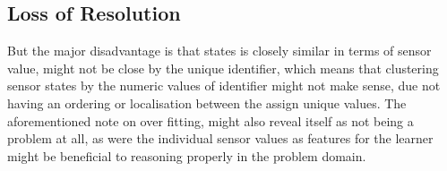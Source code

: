 \subsection{Loss of Resolution}
But the major disadvantage is that states is closely similar in terms of sensor value, might not be close by the unique identifier, which means that clustering sensor states by the numeric values of identifier might not make sense, due not having an ordering or localisation between the assign unique values.
The aforementioned note on over fitting, might also reveal itself as not being a problem at all, as were the individual sensor values as features for the learner might be beneficial to reasoning properly in the problem domain.
